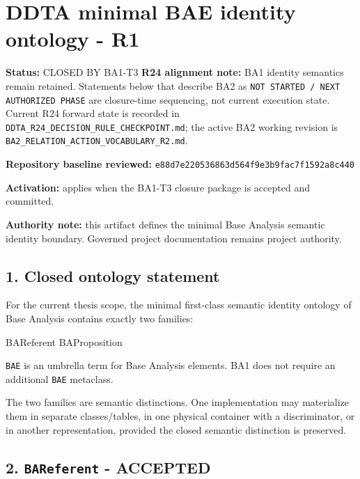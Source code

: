 \documentclass[
  10pt,
  a4paper,
]{article}
\author{}
\date{}
\newenvironment{Shaded}{}{}
\newcommand{\NormalTok}[1]{#1}
\begin{document}
\section{DDTA minimal BAE identity ontology -
R1}\label{ddta-minimal-bae-identity-ontology---r1}

\textbf{Status:} CLOSED BY BA1-T3
\textbf{R24 alignment note:} BA1 identity semantics remain retained. Statements below that describe BA2 as \texttt{NOT STARTED / NEXT AUTHORIZED PHASE} are closure-time sequencing, not current execution state. Current R24 forward state is recorded in \nolinkurl{DDTA_R24_DECISION_RULE_CHECKPOINT.md}; the active BA2 working revision is \nolinkurl{BA2_RELATION_ACTION_VOCABULARY_R2.md}.


\textbf{Repository baseline reviewed:}
\texttt{e88d7e220536863d564f9e3b9fac7f1592a8c440}

\textbf{Activation:} applies when the BA1-T3 closure package is accepted
and committed.

\textbf{Authority note:} this artifact defines the minimal Base Analysis
semantic identity boundary. Governed project documentation remains
project authority.

\subsection{1. Closed ontology
statement}\label{closed-ontology-statement}

For the current thesis scope, the minimal first-class semantic identity
ontology of Base Analysis contains exactly two families:

\begin{Shaded}
\begin{Highlighting}[]
\NormalTok{BAReferent}
\NormalTok{BAProposition}
\end{Highlighting}
\end{Shaded}

\texttt{BAE} is an umbrella term for Base Analysis elements. BA1 does
not require an additional \texttt{BAE} metaclass.

The two families are semantic distinctions. One implementation may
materialize them in separate classes/tables, in one physical container
with a discriminator, or in another representation, provided the closed
semantic distinction is preserved.

\subsection{\texorpdfstring{2. \texttt{BAReferent} -
ACCEPTED}{2. BAReferent - ACCEPTED}}\label{bareferent---accepted}
\end{document}
